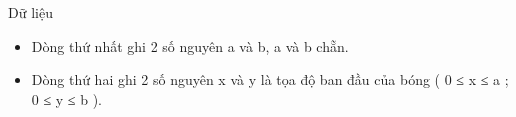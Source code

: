 Dữ liệu  
\begin{itemize}
	\item     Dòng thứ nhất ghi 2 số nguyên a và b, a và b chẵn.   
	\item     Dòng thứ hai ghi 2 số nguyên x và y là tọa độ ban đầu của bóng ( 0 ≤ x ≤ a ; 0 ≤ y ≤ b ).   
\end{itemize}